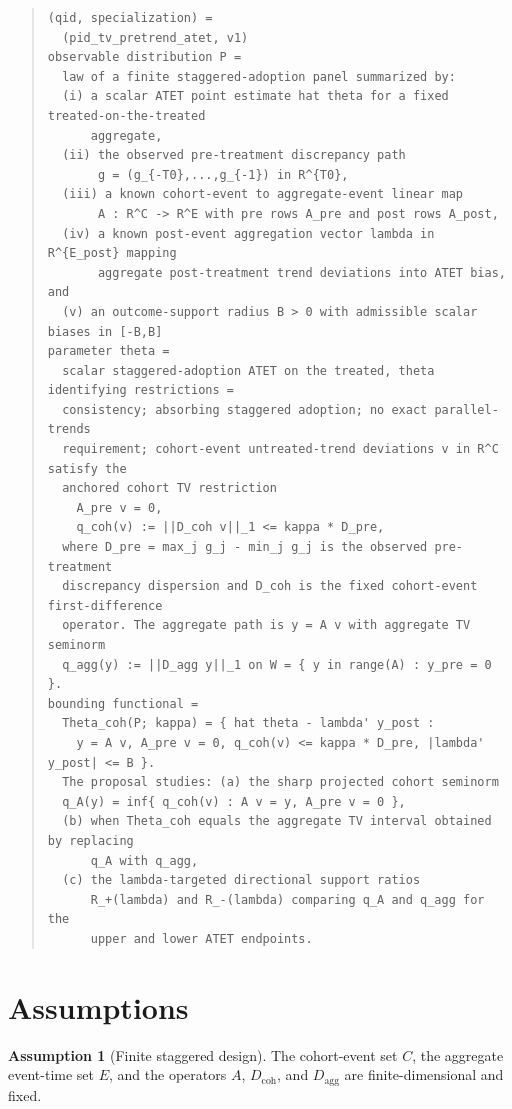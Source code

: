 \documentclass[11pt]{article}
\theoremstyle{definition}
\newtheorem{assumption}{Assumption}
\theoremstyle{plain}
\theoremstyle{remark}
\begin{document}
\begin{quote}
\begin{verbatim}
(qid, specialization) =
  (pid_tv_pretrend_atet, v1)
observable distribution P =
  law of a finite staggered-adoption panel summarized by:
  (i) a scalar ATET point estimate hat theta for a fixed treated-on-the-treated
      aggregate,
  (ii) the observed pre-treatment discrepancy path
       g = (g_{-T0},...,g_{-1}) in R^{T0},
  (iii) a known cohort-event to aggregate-event linear map
       A : R^C -> R^E with pre rows A_pre and post rows A_post,
  (iv) a known post-event aggregation vector lambda in R^{E_post} mapping
       aggregate post-treatment trend deviations into ATET bias, and
  (v) an outcome-support radius B > 0 with admissible scalar biases in [-B,B]
parameter theta =
  scalar staggered-adoption ATET on the treated, theta
identifying restrictions =
  consistency; absorbing staggered adoption; no exact parallel-trends
  requirement; cohort-event untreated-trend deviations v in R^C satisfy the
  anchored cohort TV restriction
    A_pre v = 0,
    q_coh(v) := ||D_coh v||_1 <= kappa * D_pre,
  where D_pre = max_j g_j - min_j g_j is the observed pre-treatment
  discrepancy dispersion and D_coh is the fixed cohort-event first-difference
  operator. The aggregate path is y = A v with aggregate TV seminorm
  q_agg(y) := ||D_agg y||_1 on W = { y in range(A) : y_pre = 0 }.
bounding functional =
  Theta_coh(P; kappa) = { hat theta - lambda' y_post :
    y = A v, A_pre v = 0, q_coh(v) <= kappa * D_pre, |lambda' y_post| <= B }.
  The proposal studies: (a) the sharp projected cohort seminorm
  q_A(y) = inf{ q_coh(v) : A v = y, A_pre v = 0 },
  (b) when Theta_coh equals the aggregate TV interval obtained by replacing
      q_A with q_agg,
  (c) the lambda-targeted directional support ratios
      R_+(lambda) and R_-(lambda) comparing q_A and q_agg for the
      upper and lower ATET endpoints.
\end{verbatim}
\end{quote}

\section{Assumptions}
\begin{assumption}[Finite staggered design]\label{ass:finite}
The cohort-event set \(C\), the aggregate event-time set \(E\), and the operators \(A\), \(D_{\mathrm{coh}}\), and \(D_{\mathrm{agg}}\) are finite-dimensional and fixed.
\end{assumption}
\end{document}
